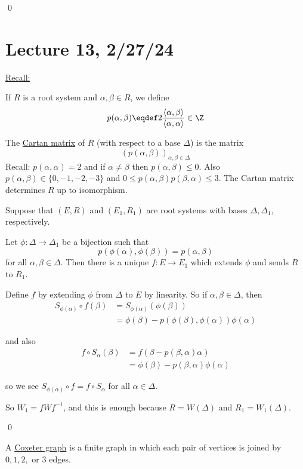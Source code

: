\documentclass[x11names,reqno,14pt]{extarticle}
\begin{document}
\qed

\section*{Lecture 13, 2/27/24}

\underline{Recall:}

If $R$ is a root system and $\alpha,\beta\in R$, we define
\[
p(\alpha,\beta)\eqdef2\frac{\langle\alpha,\beta\rangle}{\langle\alpha,\alpha\rangle}\in\Z
\]


The \underline{Cartan matrix} of $R$ (with respect to a base $\Delta$) is the matrix
\[
(p(\alpha,\beta))_{\alpha,\beta\in\Delta}
\]
Recall: $p(\alpha,\alpha)=2$ and if $\alpha\neq\beta$ then $p(\alpha,\beta)\leq0$. Also $p(\alpha,\beta) \in \{0,-1,-2,-3\}$ and $0\leq p(\alpha,\beta)p(\beta,\alpha) \leq3$. The Cartan matrix determines $R$ up to isomorphism. 

\prop

Suppose that $(E,R)$ and $(E_1,R_1)$ are root systems with bases $\Delta,\Delta_1$, respectively. 

Let $\phi:\Delta\to\Delta_1$ be a bijection such that 
\[
p(\phi(\alpha),\phi(\beta)) = p(\alpha,\beta)
\]
for all $\alpha,\beta\in\Delta$. Then there is a unique $f:E\to E_1$ which extends $\phi$ and sends $R$ to $R_1$. 

\proof

Define $f$ by extending $\phi$ from $\Delta$ to $E$ by linearity. So if $\alpha,\beta\in\Delta$, then
\begin{align*}
S_{\phi(\alpha)}\circ f(\beta) & = S_{\phi(\alpha)}(\phi(\beta)) \\
& = \phi(\beta) - p(\phi(\beta),\phi(\alpha))\phi(\alpha)
\end{align*}

and also 
\begin{align*}
f\circ S_\alpha(\beta) & = f(\beta- p(\beta,\alpha)\alpha) \\ & = \phi(\beta) - p(\beta,\alpha)\phi(\alpha)
\end{align*}

so we see $S_{\phi(\alpha)}\circ f = f\circ S_\alpha$ for all $\alpha\in\Delta$. 

So $W_1 = f W f^{-1}$, and this is enough because $R = W(\Delta)$ and $R_1 = W_1(\Delta)$. 

\qed


A \underline{Coxeter graph} is a finite graph in which each pair of vertices is joined by $0,1,2,$ or $3$ edges. 
\end{document}
